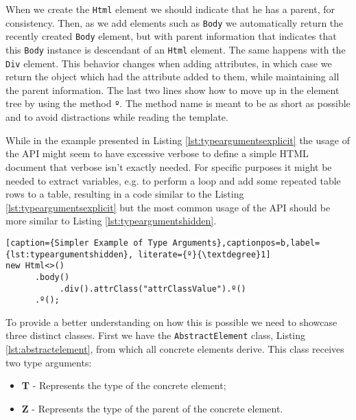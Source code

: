 \noindent
When we create the \texttt{Html} element we should indicate that he has a parent, for consistency. Then, as we add elements such as \texttt{Body} we automatically return the recently created \texttt{Body} element, but with parent information that indicates that this \texttt{Body} instance is descendant of an \texttt{Html} element. The same happens with the \texttt{Div} element. This behavior changes when adding attributes, in which case we return the object which had the attribute added to them, while maintaining all the parent information. The last two lines show how to move up in the element tree by using the method \texttt{º}. The method name is meant to be as short as possible and to avoid distractions while reading the template. 

\noindent
While in the example presented in Listing \ref{lst:typeargumentsexplicit} the usage of the \ac{API} might seem to have excessive verbose to define a simple \ac{HTML} document that verbose isn't exactly needed. For specific purposes it might be needed to extract variables, e.g. to perform a loop and add some repeated table rows to a table, resulting in a code similar to the Listing \ref{lst:typeargumentsexplicit} but the most common usage of the \ac{API} should be more similar to Listing \ref{lst:typeargumentshidden}.  

\bigskip


\begin{minipage}{\linewidth}
\begin{lstlisting}[caption={Simpler Example of Type Arguments},captionpos=b,label={lst:typeargumentshidden}, literate={º}{\textdegree}1]
new Html<>()
      .body()
           .div().attrClass("attrClassValue").º()
      .º();
\end{lstlisting}
\end{minipage}

\noindent
To provide a better understanding on how this is possible we need to showcase three distinct classes. First we have the \texttt{AbstractElement} class, Listing \ref{lst:abstractelement}, from which all concrete elements derive. This class receives two type arguments: 

\begin{itemize}
	\item \textbf{T} - Represents the type of the concrete element; 
	\item \textbf{Z} - Represents the type of the parent of the concrete element.
\end{itemize}	

